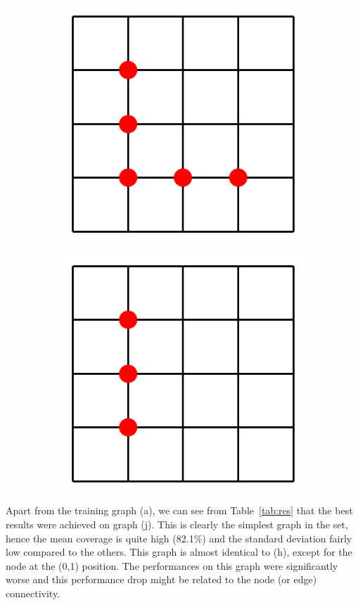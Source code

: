 \documentclass[a4paper]{article}
\begin{document}
\begin{figure}[ht]
\begin{subfigure}[b]{0.2\linewidth}
    \includegraphics[width=0.75\linewidth]{figures/maze_5x5_8.png} 
    \caption{} 
    \vspace{4ex}
  \end{subfigure}%
    \begin{subfigure}[b]{0.2\linewidth}
    \centering
    \includegraphics[width=0.75\linewidth]{figures/maze_5x5_9.png} 
    \caption{}
    \vspace{4ex}
  \end{subfigure}
\end{figure}

Apart from the training graph (a), we can see from Table~\ref{tab:res} that the best results were achieved on graph (j). This is clearly the simplest graph in the set, hence the mean coverage is quite high (82.1\%) and the standard deviation fairly low compared to the others. This graph is almost identical to (h), except for the node at the (0,1) position. The performances on this graph were significantly worse and this performance drop might be related to the node (or edge) connectivity.\\
\end{document}
